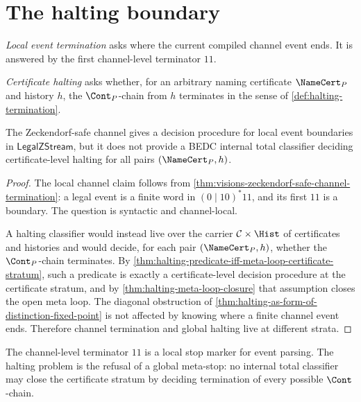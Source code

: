 \section{The halting boundary}
\label{sec:visions-channel-halting-boundary}

\begin{definition}
\label{def:visions-local-termination-vs-certificate-halting}
\emph{Local event termination} asks where the current compiled channel
event ends. It is answered by the first channel-level terminator $11$.

\emph{Certificate halting} asks whether, for an arbitrary naming
certificate $\NameCert_{P}$ and history $h$, the $\Cont_{P}$-chain from
$h$ terminates in the sense of \autoref{def:halting-termination}.
\end{definition}

\begin{theorem}
\label{thm:visions-channel-termination-not-halting-decision}
The Zeckendorf-safe channel gives a decision procedure for local event
boundaries in $\mathsf{LegalZStream}$, but it does not provide a BEDC
internal total classifier deciding certificate-level halting for all
pairs $(\NameCert_{P},h)$.
\end{theorem}

\begin{proof}
The local channel claim follows from
\autoref{thm:visions-zeckendorf-safe-channel-termination}: a legal event
is a finite word in $(0\mid10)^{*}11$, and its first $11$ is a boundary.
The question is syntactic and channel-local.

A halting classifier would instead live over the carrier
$\mathcal C\times\Hist$ of certificates and histories and would decide,
for each pair $(\NameCert_{P},h)$, whether the $\Cont_{P}$-chain
terminates. By
\autoref{thm:halting-predicate-iff-meta-loop-certificate-stratum}, such
a predicate is exactly a certificate-level decision procedure at the
certificate stratum, and by \autoref{thm:halting-meta-loop-closure} that
assumption closes the open meta loop. The diagonal obstruction of
\autoref{thm:halting-as-form-of-distinction-fixed-point} is not affected
by knowing where a finite channel event ends. Therefore channel
termination and global halting live at different strata.
\end{proof}

\begin{corollary}
\label{cor:visions-stop-codon-versus-meta-stop}
The channel-level terminator $11$ is a local stop marker for event
parsing. The halting problem is the refusal of a global meta-stop: no
internal total classifier may close the certificate stratum by deciding
termination of every possible $\Cont$-chain.
\end{corollary}

